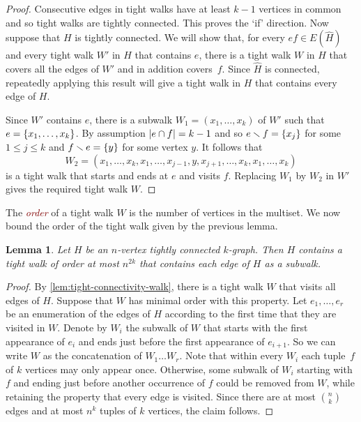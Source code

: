 \documentclass[12pt,reqno]{amsart}
\theoremstyle{plain}
\newtheorem{lemma}[theorem]{Lemma}
\theoremstyle{definition}
\numberwithin{equation}{section}
\DeclarePairedDelimiter{\abs}{\lvert}{\rvert}
\DeclarePairedDelimiter{\set}{\{}{\}}
\renewcommand{\leq}{\leqslant}
\renewcommand{\setminus}{\smallsetminus}
\newcommand{\defn}[1]{\textcolor{Maroon}{\emph{#1}}}
\begin{document}
	\begin{proof}
		Consecutive edges in tight walks have at least $k - 1$ vertices in common and so tight walks are tightly connected. This proves the `if' direction. Now suppose that $H$ is tightly connected. We will show that, for every $ef \in E(\hat{H})$ and every tight walk $W'$ in $H$ that contains $e$, there is a tight walk $W$ in $H$ that covers all the edges of $W'$ and in addition covers~$f$. Since $\hat{H}$ is connected, repeatedly applying this result will give a tight walk in $H$ that contains every edge of $H$.
		
		Since $W'$ contains $e$, there is a subwalk $W_1 = (x_1, \dotsc, x_k)$ of $W'$ such that $e = \set{x_1, \dotsc, x_k}$. By assumption $\abs{e \cap f} = k - 1$ and so $e \setminus f = \set{x_j}$ for some $1 \leq j \leq k$ and $f \setminus e = \set{y}$ for some vertex $y$. It follows that
		\begin{equation*}
			W_2 = (x_1, \dotsc, x_k, x_1, \dotsc, x_{j - 1}, y, x_{j + 1}, \dotsc, x_k, x_1, \dotsc, x_k)
		\end{equation*}
		is a tight walk that starts and ends at $e$ and visits $f$. Replacing $W_1$ by $W_2$ in $W'$ gives the required tight walk $W$.
	\end{proof}
	
	The \defn{order} of a tight walk $W$ is the number of vertices in the multiset. We now bound the order of the tight walk given by the previous lemma.
	
	\begin{lemma}\label{lem:tight-connectivity-bounded-tight-walk}
		Let $H$ be an $n$-vertex tightly connected $k$-graph.
		Then $H$ contains a tight walk of order at most $n^{2k}$ that contains each edge of $H$ as a subwalk.
	\end{lemma}
	
	\begin{proof}
		By \cref{lem:tight-connectivity-walk}, there is a tight walk $W$ that visits all edges of $H$.
		Suppose that $W$ has minimal order with this property.
		Let $e_1, \dotsc, e_r$ be an enumeration of the edges of $H$ according to the first time that they are visited in $W$.
		Denote by $W_i$ the subwalk of $W$ that starts with the first appearance of $e_i$ and ends just before the first appearance of $e_{i + 1}$.
		So we can write $W$ as the concatenation of $W_1 \dotsc W_r$.
		Note that within every $W_i$ each tuple~$f$ of $k$ vertices may only appear once.
		Otherwise, some subwalk of $W_i$ starting with $f$ and ending just before another occurrence of $f$ could be removed from $W$, while retaining the property that every edge is visited.
		Since there are at most $\binom{n}{k}$ edges and at most $n^k$ tuples of $k$ vertices, the claim follows.
	\end{proof}
	
\end{document}
